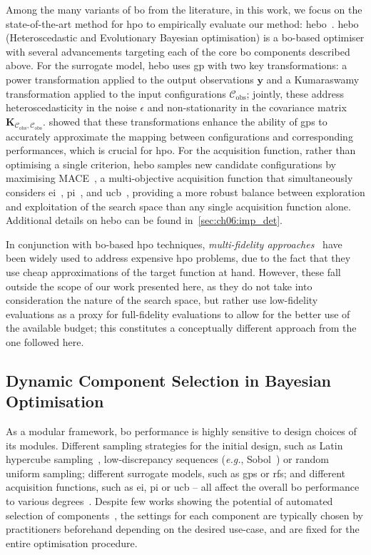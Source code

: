 Among the many variants of \gls{bo} from the literature, in this work, we focus on the state-of-the-art method for \gls{hpo} to empirically evaluate our method: \gls{hebo}~\citep{CowEtAl22}.
\gls{hebo} (Heteroscedastic and Evolutionary Bayesian optimisation) is a \gls{bo}-based optimiser with several advancements
targeting each of the core \gls{bo} components described above.
For the surrogate model, \gls{hebo} uses \gls{gp} with two key transformations: a power transformation applied to the output observations $\mathbf y$ and a Kumaraswamy transformation applied to the input configurations $\mathcal C_{\mathrm{obs}}$;
jointly, these address heteroscedasticity in the noise $\epsilon$ and non-stationarity in the covariance matrix $\mathbf K_{\mathcal C_{\mathrm{obs}},\mathcal C_{\mathrm{obs}}}$.
\citet{CowEtAl22} showed that these transformations enhance the ability of \glspl{gp} to accurately approximate the mapping between configurations and corresponding performances, which is crucial for \gls{hpo}.
For the acquisition function, rather than optimising a single criterion, \gls{hebo} samples new candidate configurations by maximising MACE~\citep{LyuEtAl18}, a multi-objective acquisition function that simultaneously considers \gls{ei}~\citep{Mockus75}, \gls{pi}~\citep{Kushner64b}, and \gls{ucb}~\citep{ForEtAl08}, providing a more robust balance between exploration and exploitation of the search space than any single acquisition function alone.
Additional details on \gls{hebo} can be found in~\cref{sec:ch06:imp_det}.

In conjunction with \gls{bo}-based \gls{hpo} techniques, \emph{multi-fidelity approaches}~\citep{LiEtAl18,LiEtAl20,FalEtAl18,AwaEtAl21} have been widely used to address expensive \gls{hpo} problems, due to the fact that they use cheap approximations of the target function at hand.
However, these fall outside the scope of our work presented here, as they do not take into consideration the nature of the search space, but rather use low-fidelity evaluations as a proxy for full-fidelity evaluations to allow for the better use of the available budget; this constitutes a conceptually different approach from the one followed here.

\subsection{Dynamic Component Selection in Bayesian Optimisation}
As a modular framework, \gls{bo} performance is highly sensitive to design choices of its modules.
Different sampling strategies for the initial design, such as Latin hypercube sampling~\citep{McKEtAl00}, low-discrepancy sequences (\emph{e.g.}, Sobol~\citep{AntSal79}) or random uniform sampling; different surrogate models, such as \glspl{gp} or \glspl{rf}; and different acquisition functions, such as \gls{ei}, \gls{pi} or \gls{ucb} -- all affect the overall \gls{bo} performance to various degrees~\citep{BosEtAl20,LinEtAl19,CowEtAl22}.
Despite few works showing the potential of automated selection of components~\citep{SalTom18,BenEtAl22c,BenEtAl22d}, the settings for each component are typically chosen by practitioners beforehand depending on the desired use-case, and are fixed for the entire optimisation procedure.

